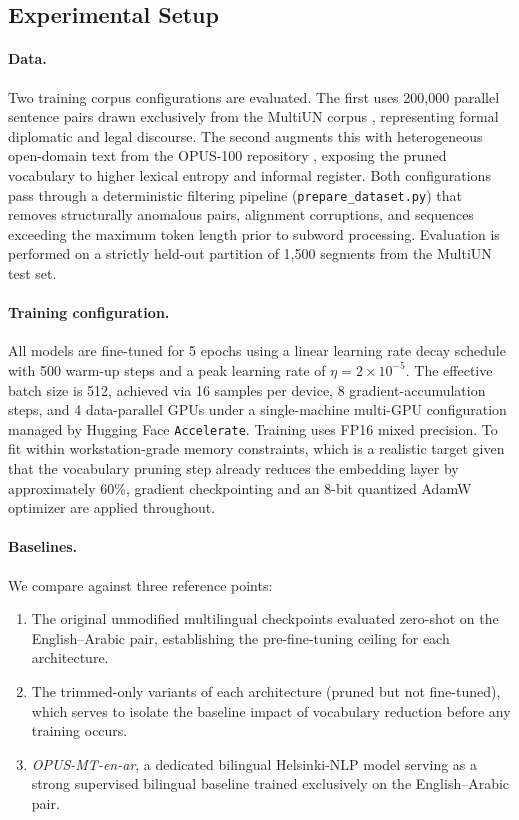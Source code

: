 \documentclass{article}
\begin{document}
	\subsection{Experimental Setup}
	\label{sec:setup}
	
	\paragraph{Data.}
	Two training corpus configurations are evaluated. The first uses 200{,}000 parallel sentence
	pairs drawn exclusively from the MultiUN corpus \citep{eisele2010multiun}, representing
	formal diplomatic and legal discourse. The second augments this with heterogeneous
	open-domain text from the OPUS-100 repository \citep{tiedemann2012parallel}, exposing
	the pruned vocabulary to higher lexical entropy and informal register. Both configurations
	pass through a deterministic filtering pipeline (\texttt{prepare\_dataset.py}) that removes
	structurally anomalous pairs, alignment corruptions, and sequences exceeding the maximum
	token length prior to subword processing. Evaluation is performed on a strictly held-out
	partition of 1,500 segments from the MultiUN test set.
	
	\paragraph{Training configuration.}
	All models are fine-tuned for 5 epochs using a linear learning rate decay schedule with
	500 warm-up steps and a peak learning rate of $\eta = 2\times10^{-5}$. The effective
	batch size is 512, achieved via 16 samples per device, 8 gradient-accumulation steps,
	and 4 data-parallel GPUs under a single-machine multi-GPU configuration managed by
	Hugging Face \texttt{Accelerate}. Training uses FP16 mixed precision. To fit within
	workstation-grade memory constraints, which is a realistic target given that the vocabulary
	pruning step already reduces the embedding layer by approximately 60\%, gradient
	checkpointing and an 8-bit quantized AdamW optimizer \citep{dettmers2022optimizers}
	are applied throughout.
	
	\paragraph{Baselines.}
	We compare against three reference points:
	\begin{enumerate}[label=(\alph*)]
		\item The original unmodified multilingual checkpoints evaluated zero-shot on the
		English--Arabic pair, establishing the pre-fine-tuning ceiling for each architecture.
		\item The trimmed-only variants of each architecture (pruned but not fine-tuned),
		which serves to isolate the baseline impact of vocabulary reduction before any training occurs.
		\item \textit{OPUS-MT-en-ar}, a dedicated bilingual Helsinki-NLP model serving as a
		strong supervised bilingual baseline trained exclusively on the English--Arabic pair.
	\end{enumerate}
	
\end{document}
